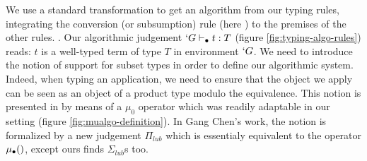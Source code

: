\documentclass{llncs}
\begin{document}
\begin{paragraph}{}
We use a standard transformation to get an algorithm from our typing
rules, integrating the conversion (or subsumption) rule
(here ) to the premises of the other rules.
. Our algorithmic judgement $`G \vdash_{\bullet} t : T$
(figure \vref{fig:typing-algo-rules})
reads: $t$ is a well-typed term of type $T$ in environment $`G$.
We need to introduce the notion of support for subset types in order to
define our algorithmic system. Indeed, when typing an application, 
we need to ensure that the object we apply can be seen as an object of a
product type modulo the equivalence. This notion is presented in \PVS{} by
means of a $\mu_0$ operator which was readily adaptable in our setting
(figure \vref{fig:mualgo-definition}). In Gang Chen's work, the notion is formalized by a
new judgement $\Pi_{lub}$ which is essentialy equivalent to the operator
$\mualgo$, except ours finds $\Sigma_{lub}$s too.
\begin{figure*}[t]
  \def\infvspace{0.5em}
    \def\type{\typea}
    \def\subt{\subta}
    \def\sub{\suba}
    \def\fCenter{\typea}
    \begin{center}
    
    
    
    


    \vspace{\infvspace}
    \AppA\DP

    
    \vspace{\infvspace}
    \SumDepA\DP

    \vspace{\infvspace}
    \PiLeftA\DP
    
    \vspace{\infvspace}
    \PiRightA\DP


\end{center}
\end{figure*}
\end{paragraph}
\end{document}
